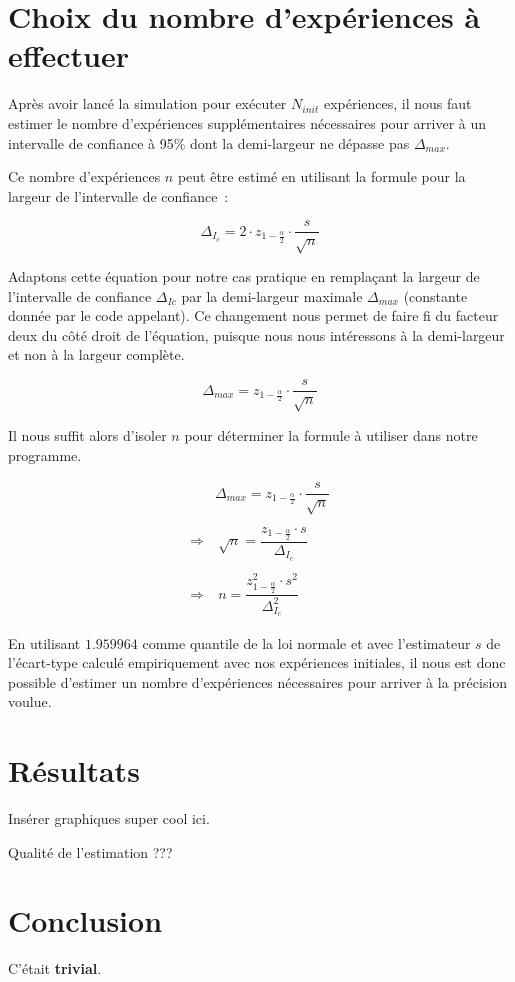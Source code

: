 \documentclass[paper=a4, fontsize=11pt]{scrartcl}
\begin{document}
\section{Choix du nombre d'expériences à effectuer}

Après avoir lancé la simulation pour exécuter $N_{init}$ expériences, il nous faut estimer le nombre d'expériences supplémentaires nécessaires pour arriver à un intervalle de confiance à 95\% dont la demi-largeur ne dépasse pas $\Delta_{max}$.

Ce nombre d'expériences $n$ peut être estimé en utilisant la formule pour la largeur de l'intervalle de confiance~:

\begin{equation*}
  \Delta_{I_c} = 2\cdot z_{1-\frac{\alpha}{2}}\cdot \dfrac{s}{\sqrt{n}}
\end{equation*}

Adaptons cette équation pour notre cas pratique en remplaçant la largeur de l'intervalle de confiance $\Delta_{Ic}$ par la demi-largeur maximale $\Delta_{max}$ (constante donnée par le code appelant). Ce changement nous permet de faire fi du facteur deux du côté droit de l'équation, puisque nous nous intéressons à la demi-largeur et non à la largeur complète.

\begin{equation*}
  \Delta_{max} = z_{1-\frac{\alpha}{2}}\cdot \dfrac{s}{\sqrt{n}}
\end{equation*}

Il nous suffit alors d'isoler $n$ pour déterminer la formule à utiliser dans notre programme.

\begin{align*}
  &\Delta_{max} = z_{1-\frac{\alpha}{2}}\cdot \dfrac{s}{\sqrt{n}} \\ \\
  \Rightarrow &\ \sqrt{n} = \dfrac{z_{1-\frac{\alpha}{2}}\cdot s}{\Delta_{I_c}} \\ \\
  \Rightarrow &\ n = \dfrac{z_{1-\frac{\alpha}{2}}^2\cdot s^2}{\Delta_{I_c}^2}
\end{align*}

En utilisant $1.959964$ comme quantile de la loi normale et avec l'estimateur $s$ de l'écart-type calculé empiriquement avec nos expériences initiales, il nous est donc possible d'estimer un nombre d'expériences nécessaires pour arriver à la précision voulue.

\section{Résultats}
Insérer graphiques super cool ici.

Qualité de l'estimation ???

\section{Conclusion}
C'était \textbf{trivial}.
\end{document}
